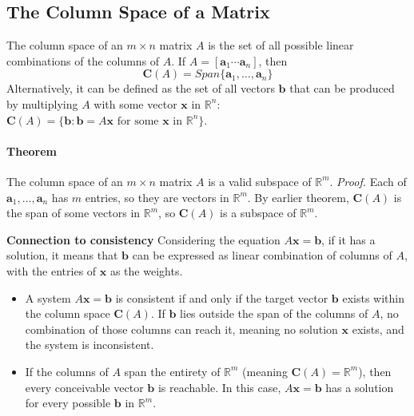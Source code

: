 \documentclass[../linear-algebra.tex]{subfiles}
\begin{document}
\subsection{The Column Space of a Matrix}
The column space of an $m \times n$ matrix $A$ is the set of all possible linear combinations of the columns of $A$.
If $A = [\mathbf{a}_1 \cdots \mathbf{a}_n]$, then
\[\mathbf{C}(A) = Span\{\mathbf{a}_1, \dots, \mathbf{a}_n\}\]
Alternatively, it can be defined as the set of all vectors $\mathbf{b}$ that can be produced by multiplying $A$ with some vector $\mathbf{x}$ in $\mathbb{R}^n$: $\mathbf{C}(A) = \{\mathbf{b} : \mathbf{b} = A\mathbf{x} \text{ for some } \mathbf{x} \text{ in } \mathbb{R}^n\}$.

\paragraph{Theorem} The column space of an $m \times n$ matrix $A$ is a valid subspace of $\mathbb{R}^m$.\newline
\textit{Proof.}
Each of $\mathbf{a}_1, \dots, \mathbf{a}_n$ has $m$ entries, so they are vectors in $\mathbb{R}^m$.
By earlier theorem, $\mathbf{C}(A)$ is the span of some vectors in $\mathbb{R}^m$, so $\mathbf{C}(A)$ is a subspace of $\mathbb{R}^m$.

\noindent\textbf{Connection to consistency}
Considering the equation $A\mathbf{x}=\mathbf{b}$, if it has a solution, it means that $\mathbf{b}$ can be expressed as linear combination of columns of $A$, with the entries of $\mathbf{x}$ as the weights.
\begin{itemize}
    \item A system $A\mathbf{x} = \mathbf{b}$ is consistent if and only if the target vector $\mathbf{b}$ exists within the column space $\mathbf{C}(A)$. If $\mathbf{b}$ lies outside the span of the columns of $A$, no combination of those columns can reach it, meaning no solution $\mathbf{x}$ exists, and the system is inconsistent.
    \item If the columns of $A$ span the entirety of $\mathbb{R}^m$ (meaning $\mathbf{C}(A) = \mathbb{R}^m$), then every conceivable vector $\mathbf{b}$ is reachable. In this case, $A\mathbf{x} = \mathbf{b}$ has a solution for every possible $\mathbf{b}$ in $\mathbb{R}^m$.
\end{itemize}
\end{document}
